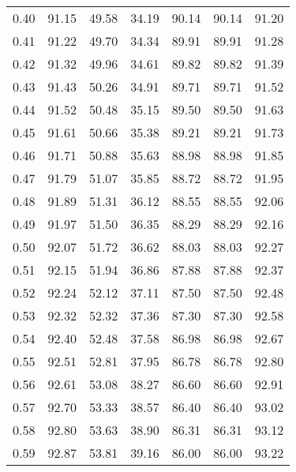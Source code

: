 \begin{tabular}{|c|c|c|c|c|c|c|}
      0.40 &     91.15 &     49.58 &      34.19 &   90.14 &      90.14 &         91.20 \\
      0.41 &     91.22 &     49.70 &      34.34 &   89.91 &      89.91 &         91.28 \\
      0.42 &     91.32 &     49.96 &      34.61 &   89.82 &      89.82 &         91.39 \\
      0.43 &     91.43 &     50.26 &      34.91 &   89.71 &      89.71 &         91.52 \\
      0.44 &     91.52 &     50.48 &      35.15 &   89.50 &      89.50 &         91.63 \\
      0.45 &     91.61 &     50.66 &      35.38 &   89.21 &      89.21 &         91.73 \\
      0.46 &     91.71 &     50.88 &      35.63 &   88.98 &      88.98 &         91.85 \\
      0.47 &     91.79 &     51.07 &      35.85 &   88.72 &      88.72 &         91.95 \\
      0.48 &     91.89 &     51.31 &      36.12 &   88.55 &      88.55 &         92.06 \\
      0.49 &     91.97 &     51.50 &      36.35 &   88.29 &      88.29 &         92.16 \\
      0.50 &     92.07 &     51.72 &      36.62 &   88.03 &      88.03 &         92.27 \\
      0.51 &     92.15 &     51.94 &      36.86 &   87.88 &      87.88 &         92.37 \\
      0.52 &     92.24 &     52.12 &      37.11 &   87.50 &      87.50 &         92.48 \\
      0.53 &     92.32 &     52.32 &      37.36 &   87.30 &      87.30 &         92.58 \\
      0.54 &     92.40 &     52.48 &      37.58 &   86.98 &      86.98 &         92.67 \\
      0.55 &     92.51 &     52.81 &      37.95 &   86.78 &      86.78 &         92.80 \\
      0.56 &     92.61 &     53.08 &      38.27 &   86.60 &      86.60 &         92.91 \\
      0.57 &     92.70 &     53.33 &      38.57 &   86.40 &      86.40 &         93.02 \\
      0.58 &     92.80 &     53.63 &      38.90 &   86.31 &      86.31 &         93.12 \\
      0.59 &     92.87 &     53.81 &      39.16 &   86.00 &      86.00 &         93.22 \\

\end{tabular}
